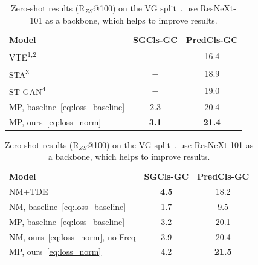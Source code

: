 \begin{table}%
    \vspace{5pt}
	\scriptsize
	\begin{center}
		\setlength{\tabcolsep}{4pt}
		\begin{minipage}{.46\linewidth}
			\centering
			\caption{\small{Zero-shot results (R$_{ZS}$@100) on the VTE split~\citep{zhang2017visual}. References: \textsuperscript{1}\citep{zhang2017visual}, \textsuperscript{2}\citep{wang2019generating}, \textsuperscript{3}\citep{yang2018shuffle}, \textsuperscript{4}\citep{wang2019generating}.}}\label{table:zs_comparison_vte}
			\begin{tabular}{lcc}
				\toprule
				\textbf{Model} & \textbf{SGCls-GC} & \textbf{PredCls-GC}\Tstrut\Bstrut\\ 
				\noalign{\smallskip}
				\midrule
				\noalign{\smallskip}
				VTE\textsuperscript{1,2} & $-$ & 16.4 \\
				STA\textsuperscript{3} & $-$ & 18.9 \\
				ST-GAN\textsuperscript{4} & $-$ & 19.0 \\
				MP, baseline~\eqref{eq:loss_baseline} & 2.3 & 20.4 \\
				\noalign{\smallskip}
				\hline
				\noalign{\smallskip}
				MP, ours~\eqref{eq:loss_norm} & \textbf{3.1} & \textbf{21.4} \\
				\bottomrule
			\end{tabular}
		\end{minipage}%
		\hspace{20pt}
		\begin{minipage}{.46\linewidth}
			\setlength{\tabcolsep}{2pt}
			\centering
			\caption{\small {Zero-shot results (R$_{ZS}$@100) on the VG split~\citep{xu2017scene}. \citet{tang2020unbiased} use ResNeXt-101 as a backbone, which helps to improve results.}}\label{table:zs_comparison_vg}
			\begin{tabular}{lcc}
				\toprule
				\textbf{Model} & \textbf{SGCls-GC} & \textbf{PredCls-GC}\Tstrut\Bstrut\\ 
				\noalign{\smallskip}
				\midrule
				\noalign{\smallskip}
				NM+TDE~\citep{tang2020unbiased} & \textbf{4.5} & 18.2 \\
				NM, baseline~\eqref{eq:loss_baseline} & 1.7 & 9.5 \\
				MP, baseline~\eqref{eq:loss_baseline} & 3.2 & 20.1 \\
				\noalign{\smallskip}
				\hline
				\noalign{\smallskip}
				NM, ours~\eqref{eq:loss_norm}, no Freq & 3.9 & 20.4 \\
				MP, ours~\eqref{eq:loss_norm} & 4.2 & \textbf{21.5} \\
				\bottomrule
			\end{tabular}
			

\end{minipage}
\end{center}
\end{table}
